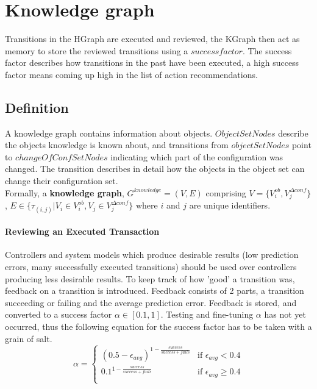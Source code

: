 \section{Knowledge graph}
\label{section: knowledge_graph}
Transitions in the HGraph are executed and reviewed, the KGraph then act as memory to store the reviewed transitions using a $success factor$. The success factor describes how transitions in the past have been executed, a high success factor means coming up high in the list of action recommendations. \\

\subsection{Definition}
A knowledge graph contains information about objects. $ObjectSetNodes$ describe the objects knowledge is known about, and transitions from $objectSetNodes$ point to $changeOfConfSetNodes$ indicating which part of the configuration was changed. The transition describes in detail how the objects in the object set can change their configuration set.\\ 

Formally, a \textbf{knowledge graph}, $G^{knowledge} = (V, E)$ comprising $V = \{V^{ob}_{i}, V^{\Delta conf}_{j}\}$, $E \in \{\tau_{(i,j)}| V_i\in V^{ob}_{i}, V_j \in V^{\Delta conf}_{j}\}$ where $i$ and $j$ are unique identifiers.\\

\paragraph{Reviewing an Executed Transaction}
Controllers and system models which produce desirable results (low prediction errors, many successfully executed transitions) should be used over controllers producing less desirable results. To keep track of how 'good' a transition was, feedback on a transition is introduced. Feedback consists of 2 parts, a transition succeeding or failing and the average prediction error. Feedback is stored, and converted to a success factor $\alpha \in [0.1, 1]$. Testing and fine-tuning $\alpha$ has not yet occurred, thus the following equation for the success factor has to be taken with a grain of salt. 
\begin{equation}
\alpha = 
      \begin{cases}
        (0.5 - \epsilon_{avg})^{1-\frac{success}{success + fails}}       & \text{if $\epsilon_{avg} < 0.4$}\\
      0.1^{1-\frac{success}{success + fails}}       & \text{if $\epsilon_{avg} \geq 0.4$}\\
    \end{cases}    
    \label{equation: success_factor}
\end{equation}

